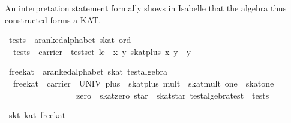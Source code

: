 \documentclass{llncs}
\begin{document}
\noindent An interpretation statement formally shows in Isabelle that
the algebra thus constructed forms a KAT.

\begin{isabellebody}
\isanewline
{}\isamarkupfalse%
\ tests\ {}{}\ {}{}a{}{}ranked{}alphabet\ skat\ ord{}\ \isanewline
\ \ {}tests\ {}\ {}carrier\ {}\ test{}set{}\ le\ {}\ {}{}x\ y{}\ skat{}plus\ x\ y\ {}\ y{}{}{}\isanewline

\isamarkupfalse%
\ free{}kat\ {}{}\ {}{}a{}{}ranked{}alphabet\ skat\ test{}algebra{}\ \isanewline
\ \ {}free{}kat\ {}\ {}carrier\ {}\ UNIV{}\ plus\ {}\ skat{}plus{}\ mult\ {}\ skat{}mult{}\ one\ {}\ skat{}one{}\isanewline
\ \ \ \ \ \ \ \ \ \ \ \ \ \ \ \ \ zero\ {}\ skat{}zero{}\ star\ {}\ skat{}star{}\ test{}algebra{}test\ {}\ tests{}{}\isanewline

\isamarkupfalse%
\ skt{}\ kat\ free{}kat\isanewline
\end{isabellebody}
\end{document}
